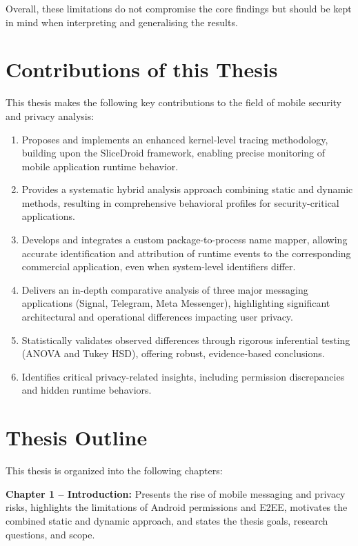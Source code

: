 \documentclass[a4paper,12pt]{report}
\begin{document}
Overall, these limitations do not compromise the core findings but should be kept in mind when interpreting and generalising the results.
\section{Contributions of this Thesis}

This thesis makes the following key contributions to the field of mobile security and privacy analysis:

\begin{enumerate}[label=\roman*.]
    \item Proposes and implements an enhanced kernel-level tracing methodology, building upon the SliceDroid framework, enabling precise monitoring of mobile application runtime behavior.
    \item Provides a systematic hybrid analysis approach combining static and dynamic methods, resulting in comprehensive behavioral profiles for security-critical applications.
    \item Develops and integrates a custom package-to-process name mapper, allowing accurate identification and attribution of runtime events to the corresponding commercial application, even when system-level identifiers differ.
    \item Delivers an in-depth comparative analysis of three major messaging applications (Signal, Telegram, Meta Messenger), highlighting significant architectural and operational differences impacting user privacy.
    \item Statistically validates observed differences through rigorous inferential testing (ANOVA and Tukey HSD), offering robust, evidence-based conclusions.
    \item Identifies critical privacy-related insights, including permission discrepancies and hidden runtime behaviors.
\end{enumerate}


\section{Thesis Outline}
This thesis is organized into the following chapters:

\textbf{Chapter 1 – Introduction:} Presents the rise of mobile messaging and privacy risks, highlights the limitations of Android permissions and E2EE, motivates the combined static and dynamic approach, and states the thesis goals, research questions, and scope.
\end{document}
